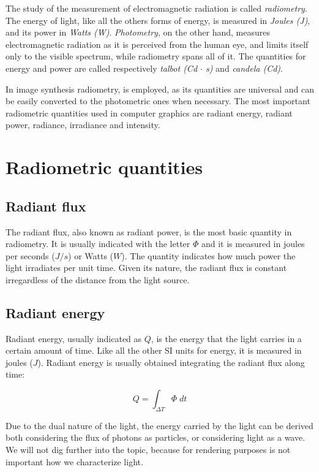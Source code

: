 The study of the measurement of electromagnetic radiation is called \emph{radiometry}. The energy of light, like all the others forms of energy, is measured in \emph{Joules (J)}, and its power in \emph{Watts (W)}. \emph{Photometry}, on the other hand, measures electromagnetic radiation as it is perceived from the human eye, and limits itself only to the visible spectrum, while radiometry spans all of it. The quantities for energy and power are called respectively \emph{talbot (Cd $\cdot$ s)} and \emph{candela (Cd)}. 

In image synthesis radiometry, is employed, as its quantities are universal and can be easily converted to the photometric ones when necessary. The most important radiometric quantities used in computer graphics are radiant energy, radiant power, radiance, irradiance and intensity.

\section{Radiometric quantities}

\subsection{Radiant flux}
The radiant flux, also known as radiant power, is the most basic quantity in radiometry. It is usually indicated with the letter $\Phi$ and it is measured in joules per seconds ($J/s$) or Watts ($W$). The quantity indicates how much power the light irradiates per unit time. Given its nature, the radiant flux is constant irregardless of the distance from the light source.

\subsection{Radiant energy}
Radiant energy, usually indicated as $Q$, is the energy that the light carries in a certain amount of time. Like all the other SI units for energy, it is measured in joules ($J$). Radiant energy is usually obtained integrating the radiant flux along time:

$$
Q = \int_{\Delta T} \Phi \; dt
$$

Due to the dual nature of the light, the energy carried by the light can be derived both considering the flux of photons as particles, or considering light as a wave. We will not dig further into the topic, because for rendering purposes is not important how we characterize light.

